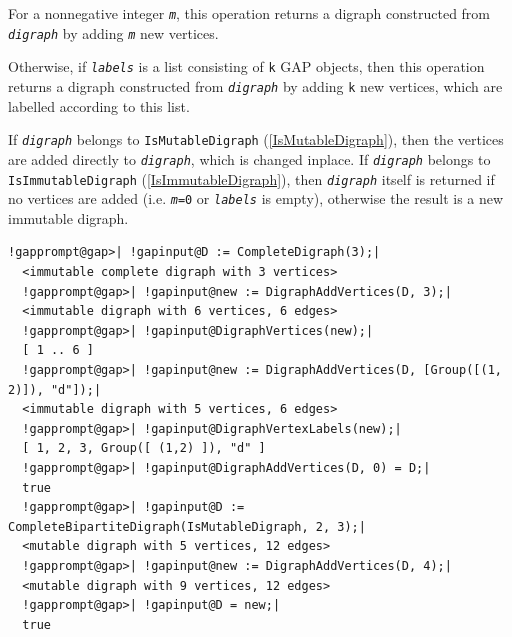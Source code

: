 \documentclass[a4paper,11pt]{report}
\begin{document}
{{{ For a non\texttt{}negative integer \mbox{\texttt{\mdseries\slshape m}}, this operation returns a digraph constructed from \mbox{\texttt{\mdseries\slshape digraph}} by adding \mbox{\texttt{\mdseries\slshape m}} new vertices. 

 Otherwise, if \mbox{\texttt{\mdseries\slshape labels}} is a list consisting of \texttt{k} \textsf{GAP} objects, then this operation returns a digraph constructed from \mbox{\texttt{\mdseries\slshape digraph}} by adding \texttt{k} new vertices, which are labelled according to this list. 

 If \mbox{\texttt{\mdseries\slshape digraph}} belongs to \texttt{IsMutableDigraph} (\ref{IsMutableDigraph}), then the vertices are added directly to \mbox{\texttt{\mdseries\slshape digraph}}, which is changed in\texttt{}place. If \mbox{\texttt{\mdseries\slshape digraph}} belongs to \texttt{IsImmutableDigraph} (\ref{IsImmutableDigraph}), then \mbox{\texttt{\mdseries\slshape digraph}} itself is returned if no vertices are added (i.e. \texttt{\mbox{\texttt{\mdseries\slshape m}}=0} or \mbox{\texttt{\mdseries\slshape labels}} is empty), otherwise the result is a new immutable digraph. 

 
\begin{Verbatim}[commandchars=!@|,fontsize=\small,frame=single,label=Example]
  !gapprompt@gap>| !gapinput@D := CompleteDigraph(3);|
  <immutable complete digraph with 3 vertices>
  !gapprompt@gap>| !gapinput@new := DigraphAddVertices(D, 3);|
  <immutable digraph with 6 vertices, 6 edges>
  !gapprompt@gap>| !gapinput@DigraphVertices(new);|
  [ 1 .. 6 ]
  !gapprompt@gap>| !gapinput@new := DigraphAddVertices(D, [Group([(1, 2)]), "d"]);|
  <immutable digraph with 5 vertices, 6 edges>
  !gapprompt@gap>| !gapinput@DigraphVertexLabels(new);|
  [ 1, 2, 3, Group([ (1,2) ]), "d" ]
  !gapprompt@gap>| !gapinput@DigraphAddVertices(D, 0) = D;|
  true
  !gapprompt@gap>| !gapinput@D := CompleteBipartiteDigraph(IsMutableDigraph, 2, 3);|
  <mutable digraph with 5 vertices, 12 edges>
  !gapprompt@gap>| !gapinput@new := DigraphAddVertices(D, 4);|
  <mutable digraph with 9 vertices, 12 edges>
  !gapprompt@gap>| !gapinput@D = new;|
  true
\end{Verbatim}
 }

 

}}
\end{document}
